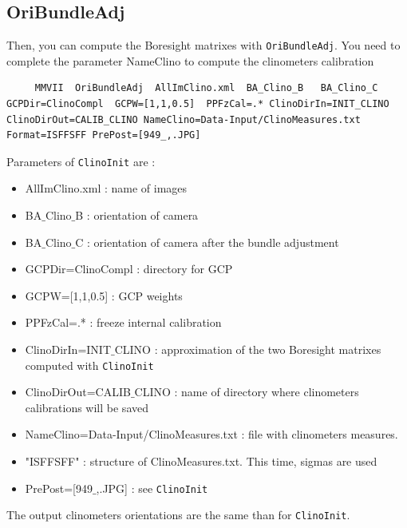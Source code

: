 \subsection{OriBundleAdj}

Then, you can compute the Boresight matrixes with {\tt OriBundleAdj}. You need to complete the parameter NameClino to compute the clinometers calibration

\begin{lstlisting}
     MMVII  OriBundleAdj  AllImClino.xml  BA_Clino_B   BA_Clino_C   GCPDir=ClinoCompl  GCPW=[1,1,0.5]  PPFzCal=.* ClinoDirIn=INIT_CLINO ClinoDirOut=CALIB_CLINO NameClino=Data-Input/ClinoMeasures.txt Format=ISFFSFF PrePost=[949_,.JPG]
\end{lstlisting}

Parameters of {\tt ClinoInit} are :
\begin{itemize}
     \item AllImClino.xml : name of images
     \item BA$\_$Clino$\_$B : orientation of camera
     \item BA$\_$Clino$\_$C : orientation of camera after the bundle adjustment
     \item GCPDir=ClinoCompl : directory for GCP
     \item GCPW=[1,1,0.5] : GCP weights
     \item PPFzCal=.* : freeze internal calibration
     \item ClinoDirIn=INIT$\_$CLINO : approximation of the two Boresight matrixes computed with {\tt ClinoInit}
     \item ClinoDirOut=CALIB$\_$CLINO : name of directory where clinometers calibrations will be saved
     \item NameClino=Data-Input/ClinoMeasures.txt : file with clinometers measures.
     \item "ISFFSFF" : structure of ClinoMeasures.txt. This time, sigmas are used
     \item PrePost=[949$\_$,.JPG] : see {\tt ClinoInit}
\end{itemize}

The output clinometers orientations are the same than for {\tt ClinoInit}.
